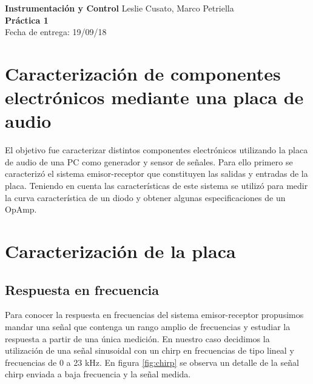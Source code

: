 \documentclass[a4paper, 11pt]{article}
\begin{document}
\noindent
\large\textbf{Instrumentación y Control} \hfill  Leslie Cusato, Marco Petriella\\
\textbf{Práctica 1}   \\
Fecha de entrega: 19/09/18 \\


\section*{Caracterización de componentes electrónicos mediante una placa de audio }
El objetivo fue caracterizar distintos componentes electrónicos utilizando la placa de audio de una PC como generador y sensor de señales. Para ello primero se caracterizó el sistema emisor-receptor que constituyen las salidas y entradas de la placa. Teniendo en cuenta las características de este sistema se utilizó para medir la curva característica de un diodo y obtener algunas especificaciones de un OpAmp.%

\section*{Caracterización de la placa}
\subsection*{Respuesta en frecuencia}
Para conocer la respuesta en frecuencias del sistema emisor-receptor propusimos mandar una señal que contenga un rango amplio de frecuencias y estudiar la respuesta a partir de una única medición. En nuestro caso decidimos la utilización de una señal sinusoidal con un chirp en frecuencias de tipo lineal y frecuencias de 0 a 23 kHz. En  figura  \ref{fig:chirp} se observa un detalle de la señal chirp enviada a baja frecuencia y la señal medida. 
\end{document}

